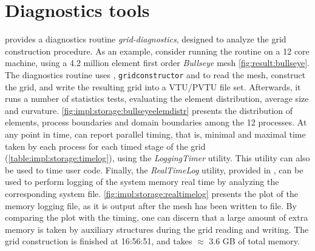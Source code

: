 \section{Diagnostics tools}
\label{section-diagnostics}

\curvgrid{} provides a diagnostics routine \textit{grid-diagnostics}, designed to analyze the grid construction procedure. As an example, consider running the routine on a 12 core machine, using a 4.2 million element first order \textit{Bullseye} mesh \cref{fig:result:bullseye}. The diagnostics routine uses \curvreader{}, \texttt{gridconstructor} and \curvwriter{} to read the mesh, construct the grid, and write the resulting grid into a VTU/PVTU file set. Afterwards, it runs a number of statistics tests, evaluating the element distribution, average size and curvature. \cref{fig:impl:storage:bullseyeelemdistr} presents the distribution of elements, process boundaries and domain boundaries among the 12 processes. At any point in time, \curvgrid{} can report parallel timing, that is, minimal and maximal time taken by each process for each timed stage of the grid (\cref{table:impl:storage:timelog}), using the \textit{LoggingTimer} utility. This utility can also be used to time user code. Finally, the \textit{RealTimeLog} utility, provided in \curvgrid{}, can be used to perform logging of the system memory real time by analyzing the corresponding system file. \cref{fig:impl:storage:realtimelog} presents the plot of the memory logging file, as it is output after the mesh has been written to file. By comparing the plot with the timing, one can discern that a large amount of extra memory is taken by auxiliary structures during the grid reading and writing. The grid construction is finished at 16:56:51, and takes $\approx$ 3.6 GB of total memory.

